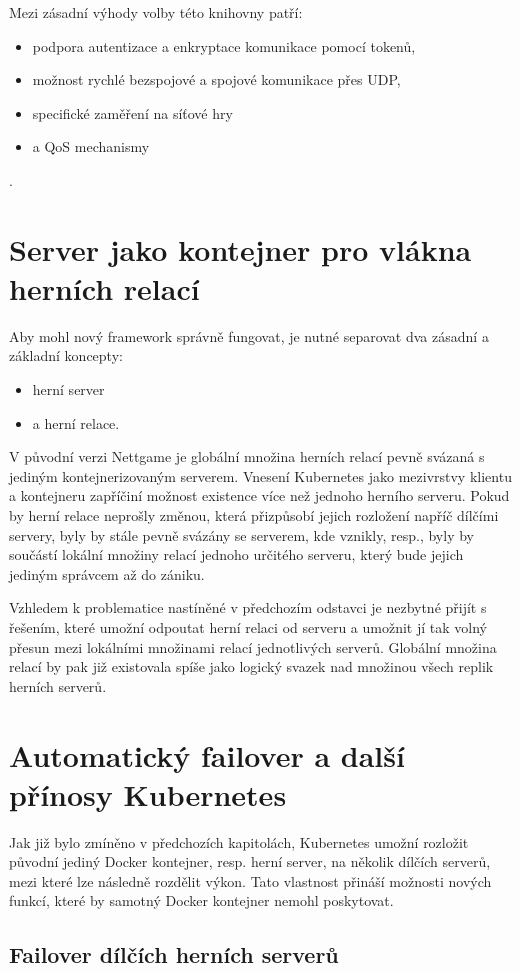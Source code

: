 \documentclass{article}
\begin{document}
Mezi zásadní výhody volby této knihovny patří:
\begin{itemize}
\item podpora autentizace a enkryptace komunikace pomocí tokenů,
\item možnost rychlé bezspojové a spojové komunikace přes UDP,
\item specifické zaměření na síťové hry
    \item a QoS mechanismy
\end{itemize} \cite{TODO}.
\newpage
\section{Server jako kontejner pro vlákna herních relací}
Aby mohl nový framework správně fungovat, je nutné separovat dva zásadní a základní koncepty: 
\begin{itemize}
\item herní server 
\item a herní relace. 
\end{itemize}

V původní verzi Nettgame je globální množina herních relací pevně svázaná s jediným kontejnerizovaným serverem. Vnesení Kubernetes jako mezivrstvy klientu a kontejneru zapříčiní možnost existence více než jednoho herního serveru. Pokud by herní relace neprošly změnou, která přizpůsobí jejich rozložení napříč dílčími servery, byly by stále pevně svázány se serverem, kde vznikly, resp., byly by součástí lokální množiny relací jednoho určitého serveru, který bude jejich jediným správcem až do zániku.

Vzhledem k problematice nastíněné v předchozím odstavci je nezbytné přijít s řešením, které umožní odpoutat herní relaci od serveru a umožnit jí tak volný přesun mezi lokálními množinami relací jednotlivých serverů. Globální množina relací by pak již existovala spíše jako logický svazek nad množinou všech replik herních serverů.
\newpage
\section{Automatický failover a další přínosy Kubernetes}
Jak již bylo zmíněno v předchozích kapitolách, Kubernetes umožní rozložit původní jediný Docker kontejner, resp. herní server, na několik dílčích serverů, mezi které lze následně rozdělit výkon. Tato vlastnost přináší možnosti nových funkcí, které by samotný Docker kontejner nemohl poskytovat.
\subsection{Failover dílčích herních serverů}
\end{document}
